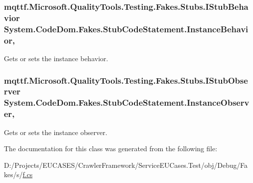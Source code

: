 \hypertarget{class_system_1_1_code_dom_1_1_fakes_1_1_stub_code_statement_a92f148ea4ee2f268db127b5532963ea0}{
\subsubsection[{Instance\-Behavior}]{\setlength{\rightskip}{0pt plus 5cm}mqttf.\-Microsoft.\-Quality\-Tools.\-Testing.\-Fakes.\-Stubs.\-I\-Stub\-Behavior System.\-Code\-Dom.\-Fakes.\-Stub\-Code\-Statement.\-Instance\-Behavior\hspace{0.3cm}{\ttfamily [get]}, {\ttfamily [set]}}}\label{class_system_1_1_code_dom_1_1_fakes_1_1_stub_code_statement_a92f148ea4ee2f268db127b5532963ea0}


Gets or sets the instance behavior.

\hypertarget{class_system_1_1_code_dom_1_1_fakes_1_1_stub_code_statement_a597c6cc3f71db81ca09e14607f4bca1d}{
\subsubsection[{Instance\-Observer}]{\setlength{\rightskip}{0pt plus 5cm}mqttf.\-Microsoft.\-Quality\-Tools.\-Testing.\-Fakes.\-Stubs.\-I\-Stub\-Observer System.\-Code\-Dom.\-Fakes.\-Stub\-Code\-Statement.\-Instance\-Observer\hspace{0.3cm}{\ttfamily [get]}, {\ttfamily [set]}}}\label{class_system_1_1_code_dom_1_1_fakes_1_1_stub_code_statement_a597c6cc3f71db81ca09e14607f4bca1d}


Gets or sets the instance observer.



The documentation for this class was generated from the following file\-:\begin{DoxyCompactItemize}
\item 
D\-:/\-Projects/\-E\-U\-C\-A\-S\-E\-S/\-Crawler\-Framework/\-Service\-E\-U\-Cases.\-Test/obj/\-Debug/\-Fakes/s/\hyperlink{s_2f_8cs}{f.\-cs}\end{DoxyCompactItemize}

